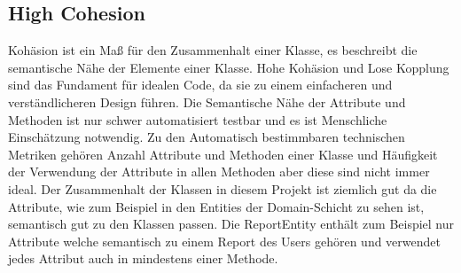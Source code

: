 \subsection{High Cohesion}
Kohäsion ist ein Maß für den Zusammenhalt einer Klasse, es beschreibt die semantische Nähe der Elemente einer Klasse.
Hohe Kohäsion und Lose Kopplung sind das Fundament für idealen Code, da sie zu einem einfacheren und verständlicheren Design führen.
Die Semantische Nähe der Attribute und Methoden ist nur schwer automatisiert testbar und es ist Menschliche Einschätzung notwendig.
Zu den Automatisch bestimmbaren technischen Metriken gehören Anzahl Attribute und Methoden einer Klasse und Häufigkeit der Verwendung der Attribute in allen Methoden aber diese sind nicht immer ideal.
Der Zusammenhalt der Klassen in diesem Projekt ist ziemlich gut da die Attribute, wie zum Beispiel in den Entities der Domain-Schicht zu sehen ist, semantisch gut zu den Klassen passen.
Die ReportEntity enthält zum Beispiel nur Attribute welche semantisch zu einem Report des Users gehören und verwendet jedes Attribut auch in mindestens einer Methode.
